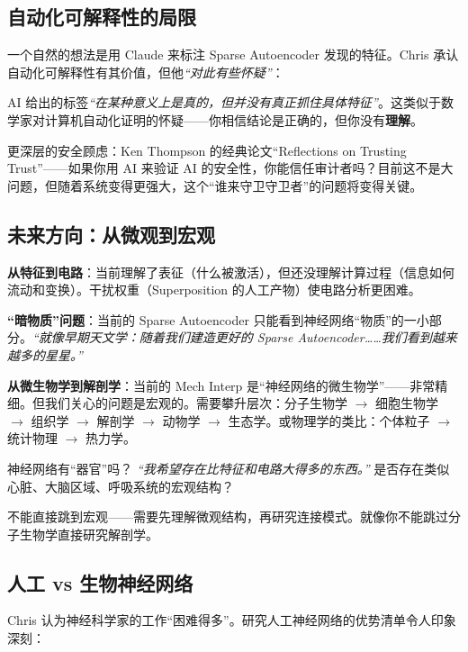 \subsection{自动化可解释性的局限}

一个自然的想法是用 Claude 来标注 Sparse Autoencoder 发现的特征。Chris 承认自动化可解释性有其价值，但他\textit{``对此有些怀疑''}：

AI 给出的标签\textit{``在某种意义上是真的，但并没有真正抓住具体特征''}。这类似于数学家对计算机自动化证明的怀疑——你相信结论是正确的，但你没有\textbf{理解}。

更深层的安全顾虑：Ken Thompson 的经典论文``Reflections on Trusting Trust''——如果你用 AI 来验证 AI 的安全性，你能信任审计者吗？目前这不是大问题，但随着系统变得更强大，这个``谁来守卫守卫者''的问题将变得关键。

\subsection{未来方向：从微观到宏观}

\textbf{从特征到电路}：当前理解了表征（什么被激活），但还没理解计算过程（信息如何流动和变换）。干扰权重（Superposition 的人工产物）使电路分析更困难。

\textbf{``暗物质''问题}：当前的 Sparse Autoencoder 只能看到神经网络``物质''的一小部分。\textit{``就像早期天文学：随着我们建造更好的 Sparse Autoencoder……我们看到越来越多的星星。''}

\textbf{从微生物学到解剖学}：当前的 Mech Interp 是``神经网络的微生物学''——非常精细。但我们关心的问题是宏观的。需要攀升层次：分子生物学 $\to$ 细胞生物学 $\to$ 组织学 $\to$ 解剖学 $\to$ 动物学 $\to$ 生态学。或物理学的类比：个体粒子 $\to$ 统计物理 $\to$ 热力学。

\begin{knowledgebox}{神经网络有``器官''吗？}
\textit{``我希望存在比特征和电路大得多的东西。''} 是否存在类似心脏、大脑区域、呼吸系统的宏观结构？

不能直接跳到宏观——需要先理解微观结构，再研究连接模式。就像你不能跳过分子生物学直接研究解剖学。
\end{knowledgebox}

\subsection{人工 vs 生物神经网络}

Chris 认为神经科学家的工作``困难得多''。研究人工神经网络的优势清单令人印象深刻：


